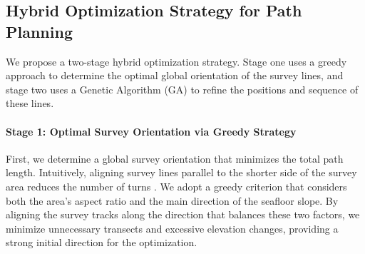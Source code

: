 \documentclass[compress]{cm}
\begin{document}
\subsection{Hybrid Optimization Strategy for Path Planning}
We propose a two-stage hybrid optimization strategy. Stage one uses a greedy approach to determine the optimal global orientation of the survey lines, and stage two uses a Genetic Algorithm (GA) to refine the positions and sequence of these lines.

\paragraph{Stage 1: Optimal Survey Orientation via Greedy Strategy}
First, we determine a global survey orientation that minimizes the total path length. Intuitively, aligning survey lines parallel to the shorter side of the survey area reduces the number of turns \cite{li2024full}. We adopt a greedy criterion that considers both the area's aspect ratio and the main direction of the seafloor slope. By aligning the survey tracks along the direction that balances these two factors, we minimize unnecessary transects and excessive elevation changes, providing a strong initial direction for the optimization.
\end{document}
